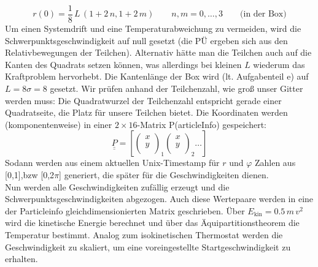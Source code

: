 \begin{equation*}
r(0) = \frac{1}{8}\,L\, \left( 1 + 2\,n,1+2\,m\right) \qquad n,m = 0,\ldots,3 \qquad \text{(in der Box)}
\end{equation*}
Um einen Systemdrift und eine Temperaturabweichung zu vermeiden, wird die Schwerpunktsgeschwindigkeit auf null gesetzt (die PÜ ergeben sich aus den Relativbewegungen der Teilchen). Alternativ hätte man die Teilchen auch auf die Kanten des Quadrats setzen können, was allerdings bei kleinen $L$ wiederum das Kraftproblem hervorhebt.
Die Kantenlänge der Box wird (lt. Aufgabenteil e) auf $L = 8\sigma= 8$ gesetzt. Wir prüfen anhand der Teilchenzahl, wie groß unser Gitter werden muss: Die Quadratwurzel der Teilchenzahl entspricht gerade einer Quadratseite, die Platz für unsere Teilchen bietet. Die Koordinaten werden (komponentenweise) in einer $2\times16$-Matrix P(articleInfo) gespeichert:
\begin{equation*}
	\underline{\underline{P}} = 
	\left[
	\begin{pmatrix}
		x\\
		y\\		
	\end{pmatrix}_1
	\begin{pmatrix}
		x\\
		y\\		
	\end{pmatrix}_2
	\ldots
	\right]
\end{equation*}
Sodann werden aus einem aktuellen Unix-Timestamp für $r$ und $\varphi$ Zahlen aus [0,1],bzw [0,2$\pi$] generiert, die später für die Geschwindigkeiten dienen.\\

Nun werden alle Geschwindigkeiten zufällig erzeugt und die Schwerpunktsgeschwindigkeiten abgezogen. Auch diese Wertepaare werden in eine der Particleinfo gleichdimensionierten Matrix geschrieben. Über $E_{\text{kin}} = 0.5\,m\,v^2$ wird die kinetische Energie berechnet und über das Äquipartitionstheorem die Temperatur bestimmt. Analog zum isokinetischen Thermostat werden die Geschwindigkeit zu skaliert, um eine voreingestellte Startgeschwindigkeit zu erhalten.

